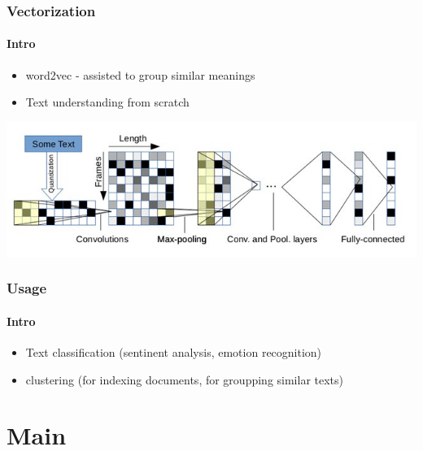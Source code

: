 \documentclass[compress,red]{beamer}
\begin{document}
%
%
%
%
\begin{frame}\frametitle{Vectorization}
\framesubtitle{Intro}
\begin{itemize}
\item word2vec - assisted to group similar meanings
\item Text understanding from scratch
\end{itemize}
\begin{center}\includegraphics[width=1.0\columnwidth]{text-deep-learning.jpg}
\end{center}
\end{frame}

%
%
%
\begin{frame}\frametitle{Usage}
\framesubtitle{Intro}
\begin{itemize}
\item Text classification (sentinent analysis, emotion recognition)
\item clustering (for indexing documents, for groupping similar texts)
\end{itemize}
\end{frame}

\section{Main}
\end{document}
